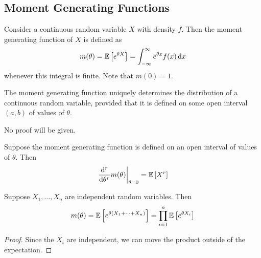 \subsection{Moment Generating Functions}
Consider a continuous random variable \(X\) with density \(f\).
Then the moment generating function of \(X\) is defined as
\[
	m(\theta) = \mathbb{E}\left[{e^{\theta X}}\right] = \int_{-\infty}^\infty e^{\theta x} f(x) \dd{x}
\]
whenever this integral is finite.
Note that \(m(0) = 1\).
\begin{theorem}
	The moment generating function uniquely determines the distribution of a continuous random variable, provided that it is defined on some open interval \((a, b)\) of values of \(\theta\).
\end{theorem}
\noindent No proof will be given.
\begin{theorem}
	Suppose the moment generating function is defined on an open interval of values of \(\theta\).
	Then
	\[
		\eval{\dv[r]{\theta}m(\theta)}_{\theta = 0} = \expect{X^r}
	\]
\end{theorem}
\begin{theorem}
	Suppose \(X_1, \dots, X_n\) are independent random variables.
	Then
	\[
		m(\theta) = \mathbb{E}\left[{e^{\theta(X_1 + \dots + X_n)}}\right] = \prod_{i=1}^n \mathbb{E}\left[{e^{\theta X_i}}\right]
	\]
\end{theorem}
\begin{proof}
	Since the \(X_i\) are independent, we can move the product outside of the expectation.
\end{proof}

